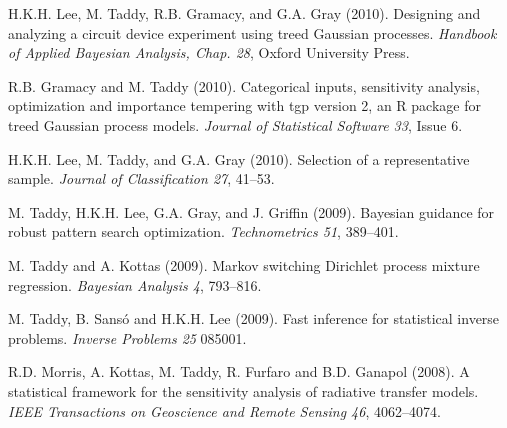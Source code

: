 \documentclass[margin,line]{res}
\begin{document}
\begin{resume}
H.K.H. Lee, M. Taddy, R.B. Gramacy, and G.A. Gray
(2010). Designing and analyzing a circuit device experiment using
treed Gaussian processes.  {\it Handbook of Applied
  Bayesian Analysis, Chap. 28}, Oxford University Press.

R.B. Gramacy and M. Taddy (2010). Categorical inputs, sensitivity
       analysis, optimization and importance tempering with tgp version 2, an
       R package for treed Gaussian process models. {\it Journal of Statistical Software 33}, Issue 6.


H.K.H. Lee, M. Taddy, and G.A. Gray (2010). Selection of a representative sample.
{\it Journal of Classification 27}, 41--53.

M.  Taddy, H.K.H. Lee, G.A. Gray, and J. Griffin (2009).  Bayesian guidance for robust pattern search optimization.
{\it Technometrics 51}, 389--401.

M. Taddy and A. Kottas (2009).  Markov switching Dirichlet process mixture regression.
{\it Bayesian Analysis 4}, 793--816.

M.  Taddy, B. Sans\'o and H.K.H. Lee (2009). Fast inference for statistical inverse problems.  {\it Inverse Problems 25} 085001.

R.D. Morris, A. Kottas, M. Taddy, R. Furfaro and B.D. Ganapol (2008).
A statistical framework for the sensitivity analysis of radiative transfer models.
{\it IEEE Transactions on Geoscience and Remote Sensing 46}, 4062--4074.








\end{resume}
\end{document}
